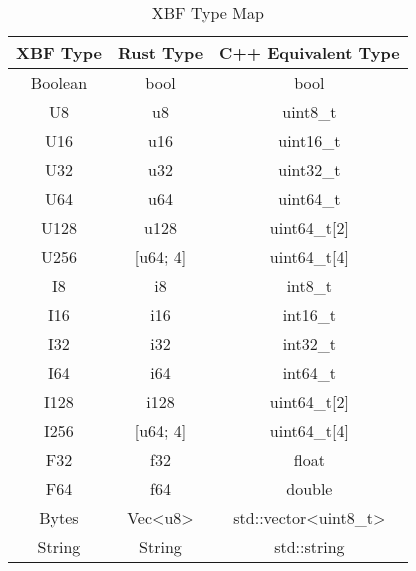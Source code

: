 \documentclass[conference]{IEEEtran}
\begin{document}
\begin{table}[htbp]
	\caption{XBF Type Map}\label{type_map}
	\begin{center}
		\begin{tabular}{|c|c|c|}
			\hline
			\textbf{XBF Type} & \textbf{Rust Type}          & \textbf{C++ Equivalent Type}              \\
			\hline
			Boolean           & bool                        & bool                                      \\
			U8                & u8                          & uint8\_t                                  \\
			U16               & u16                         & uint16\_t                                 \\
			U32               & u32                         & uint32\_t                                 \\
			U64               & u64                         & uint64\_t                                 \\
			U128              & u128                        & uint64\_t[2]                              \\
			U256              & [u64; 4]                    & uint64\_t[4]                              \\
			I8                & i8                          & int8\_t                                   \\
			I16               & i16                         & int16\_t                                  \\
			I32               & i32                         & int32\_t                                  \\
			I64               & i64                         & int64\_t                                  \\
			I128              & i128                        & uint64\_t[2]                              \\
			I256              & [u64; 4]                    & uint64\_t[4]                              \\
			F32               & f32                         & float                                     \\
			F64               & f64                         & double                                    \\
			Bytes             & Vec\textless u8\textgreater & std::vector\textless uint8\_t\textgreater \\
			String            & String                      & std::string                               \\
			\hline
		\end{tabular}
	\end{center}
\end{table}
\end{document}
